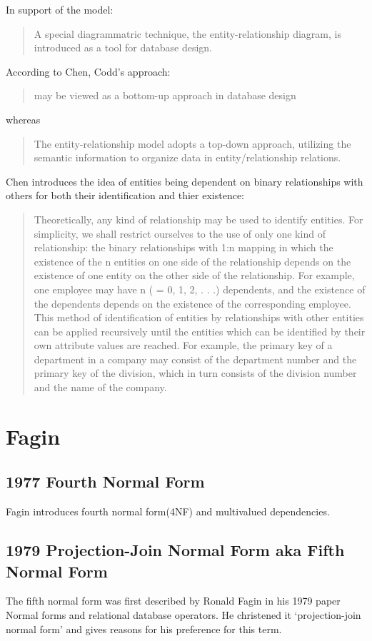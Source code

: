 \documentclass[10pt,a4paper]{scrartcl}
\newcommand{\displaybibentry}[1]
{\begin{framed}
\bibentry{#1}
\end{framed}
}
\begin{document}
In support of the model:
\begin{quote}
A special diagrammatric technique, the entity-relationship diagram, is introduced as a tool for database design. 
\end{quote}

According to Chen, Codd's approach:
\begin{quote}
may be viewed as a bottom-up approach in database design 
\end{quote}
whereas 
\begin{quote}
The entity-relationship model adopts a top-down approach, utilizing the semantic information to organize
data in entity/relationship relations.
\end{quote}

Chen   introduces the idea of entities being dependent on binary relationships 
with others for both their identification and thier existence:
\begin{quote}
Theoretically, any kind of relationship may be used to identify entities. For
simplicity, we shall restrict ourselves to the use of only one kind of relationship:
the binary relationships with 1:n mapping in which the existence of the n entities
on one side of the relationship depends on the existence of one entity on the other
side of the relationship. For example, one employee may have n ( = 0, 1, 2, . . .)
dependents, and the existence of the dependents depends on the existence of the
corresponding employee.
This method of identification of entities by relationships with other entities can
be applied recursively until the entities which can be identified by their own attribute
values are reached. For example, the primary key of a department in a
company may consist of the department number and the primary key of the
division, which in turn consists of the division number and the name of the company.
\end{quote}

\section{Fagin}
\subsection{1977 Fourth Normal Form}
\displaybibentry{Fagin1977}
Fagin \cite{Fagin1977} introduces fourth normal form(4NF) and multivalued dependencies.

\subsection{1979 Projection-Join Normal Form aka Fifth Normal Form}
The fifth normal form was first described by Ronald Fagin in his 1979  paper Normal forms and relational database operators\cite{Fagin1979}. He christened it `projection-join normal form' and gives reasons for his preference for this term.
\end{document}
